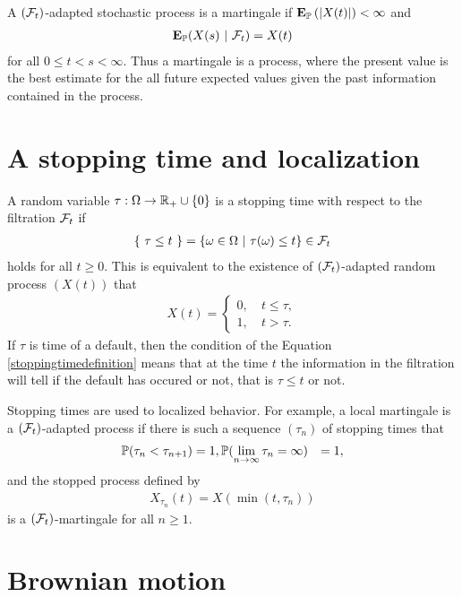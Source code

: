 A $(\mathcal{F}_t)$-adapted stochastic process is a martingale if $\operatorname{\boldsymbol{\mathrm{E}}}_{\mathbb{P}} \left( \left| X(t) \right| \right) < \infty$ and
  \begin{align}
    \operatorname{\boldsymbol{\mathrm{E}}}_{\mathbb{P}} ( X(s) \ | \ \mathcal{F}_t ) = X(t)
  \end{align} 
for all $0 \leq t < s < \infty$. Thus a martingale is a process, where the present value is the best estimate for the all future expected values given the past information contained in the process.

\section{A stopping time and localization}
\label{sec:stoppingtime}

A random variable $\tau : \Omega \rightarrow \mathbb{R}_+ \cup \{ 0 \}$ is a stopping time with respect to the filtration $\mathcal{F}_t$ if
	\begin{align}
		\label{stoppingtimedefinition}
		\{ \ \tau \leq t \ \} = \{ \omega \in \Omega \ | \ \tau(\omega) \leq t \} \in \mathcal{F}_t
	\end{align}
holds for all $t \geq 0$. This is equivalent to the existence of $(\mathcal{F}_t)$-adapted random process $(X(t))$ that
	\begin{align}
		X(t) = \begin{cases} 0, \ &t \leq \tau, \\ 1, \ &t > \tau . \end{cases}
	\end{align}
If $\tau$ is time of a default, then the condition of the Equation \ref{stoppingtimedefinition} means that at the time $t$ the information in the filtration will tell if the default has occured or not, that is $\tau \leq t$ or not.

Stopping times are used to localized behavior. For example, a local martingale is a $(\mathcal{F}_t)$-adapted process 
if there is such a sequence $(\tau_n)$ of stopping times that
	\begin{align}
		\mathbb{P} ( \tau_n < \tau_{n+1} ) &= 1,
		\mathbb{P} ( \lim\limits_{n \rightarrow \infty} \tau_n = \infty ) &= 1,
	\end{align}
and the stopped process defined by
	\begin{align}
		X_{\tau_n}(t) = X( \min(t, \tau_n) )
	\end{align}
is a $(\mathcal{F}_t)$-martingale for all $n \geq 1$.

\section{Brownian motion}

